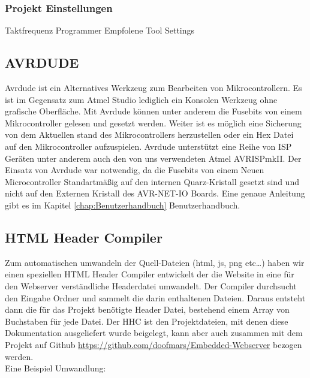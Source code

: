 \subsubsection{Projekt Einstellungen}

Taktfrequenz
Programmer
Empfolene Tool Settings

\subsection{AVRDUDE}

Avrdude ist ein Alternatives Werkzeug zum Bearbeiten von Mikrocontrollern. Es
ist im Gegensatz zum Atmel Studio lediglich ein Konsolen Werkzeug ohne
grafische Oberfläche. Mit Avrdude können unter anderem die Fusebits von einem
Mikrocontroller gelesen und gesetzt werden. Weiter ist es möglich eine Sicherung
von dem Aktuellen stand des Mikrocontrollers herzustellen oder ein Hex Datei auf
den Mikrocontroller aufzuspielen. Avrdude unterstützt eine Reihe von \ac{ISP}
Geräten unter anderem auch den von uns verwendeten Atmel AVRISPmkII. Der Einsatz von
Avrdude war notwendig, da die Fusebits von einem Neuen Microcontroller
Standartmäßig auf den internen Quarz-Kristall gesetzt sind und nicht auf den
Externen Kristall des AVR-NET-IO Boards.
Eine genaue Anleitung gibt es im Kapitel \ref{chap:Benutzerhandbuch}
Benutzerhandbuch.

\subsection{HTML Header Compiler}
\label{chap:hintergrund.HHC}

Zum automatischen umwandeln der Quell-Dateien (html, js, png etc\ldots) haben
wir einen speziellen HTML Header Compiler entwickelt der die Website in eine
für den Webserver verständliche Headerdatei umwandelt. Der Compiler durchsucht
den Eingabe Ordner und sammelt die darin enthaltenen Dateien. Daraus entsteht
dann die für das Projekt benötigte Header Datei, bestehend einem Array von
Buchstaben für jede Datei. Der \ac{HHC} ist den Projektdateien, mit denen diese
Dokumentation ausgeliefert wurde beigelegt, kann aber auch zusammen mit dem
Projekt auf Github \url{https://github.com/doofmars/Embedded-Webserver}
bezogen werden.\\

Eine Beispiel Umwandlung: 

